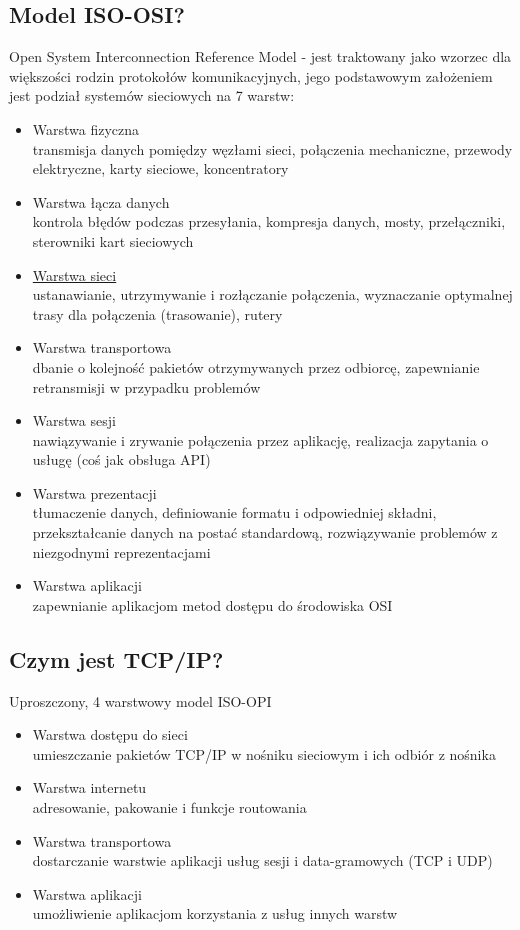 \documentclass[]{article}
\begin{document}
\subsection{Model ISO-OSI?}
Open System Interconnection Reference Model - jest traktowany jako wzorzec dla większości rodzin protokołów komunikacyjnych, jego podstawowym założeniem jest podział systemów sieciowych na 7 warstw:
\begin{itemize}
    \item Warstwa fizyczna \\
    transmisja danych pomiędzy węzłami sieci, połączenia mechaniczne, przewody elektryczne, karty sieciowe, koncentratory
    \item Warstwa łącza danych \\
    kontrola błędów podczas przesyłania, kompresja danych, mosty, przełączniki, sterowniki kart sieciowych
    \item \hyperref[sec:warstwa-sieci]{Warstwa sieci} \\
    ustanawianie, utrzymywanie i rozłączanie połączenia, wyznaczanie optymalnej trasy dla połączenia (trasowanie), rutery
    \item Warstwa transportowa \\
    dbanie o kolejność pakietów otrzymywanych przez odbiorcę, zapewnianie retransmisji w przypadku problemów
    \item Warstwa sesji \\
    nawiązywanie i zrywanie połączenia przez aplikację, realizacja zapytania o usługę (coś jak obsługa API)
    \item Warstwa prezentacji \\
    tłumaczenie danych, definiowanie formatu i odpowiedniej składni, przekształcanie danych na postać standardową, rozwiązywanie problemów z niezgodnymi reprezentacjami
    \item Warstwa aplikacji \\
    zapewnianie aplikacjom metod dostępu do środowiska OSI
\end{itemize}

\subsection{Czym jest TCP/IP?}
Uproszczony, 4 warstwowy model ISO-OPI
\begin{itemize}
    \item Warstwa dostępu do sieci \\
    umieszczanie pakietów TCP/IP w nośniku sieciowym i ich odbiór z nośnika
    \item Warstwa internetu \\
    adresowanie, pakowanie i funkcje routowania
    \item Warstwa transportowa \\
    dostarczanie warstwie aplikacji usług sesji i data-gramowych (TCP i UDP)
    \item Warstwa aplikacji \\
    umożliwienie aplikacjom korzystania z usług innych warstw
\end{itemize}
\end{document}
